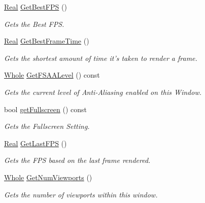 \begin{DoxyCompactItemize}
\hyperlink{namespaceMezzanine_a726731b1a7df72bf3583e4a97282c6f6}{Real} \hyperlink{classMezzanine_1_1GameWindow_a366478a0038149d243d0ef19eacea696}{GetBestFPS} ()
\begin{DoxyCompactList}\small\item\em Gets the Best FPS. \item\end{DoxyCompactList}\item 
\hyperlink{namespaceMezzanine_a726731b1a7df72bf3583e4a97282c6f6}{Real} \hyperlink{classMezzanine_1_1GameWindow_add46a3048c8eb963dae0758c47316bc4}{GetBestFrameTime} ()
\begin{DoxyCompactList}\small\item\em Gets the shortest amount of time it's taken to render a frame. \item\end{DoxyCompactList}\item 
\hyperlink{namespaceMezzanine_adcbb6ce6d1eb4379d109e51171e2e493}{Whole} \hyperlink{classMezzanine_1_1GameWindow_a221263d2fe846eeaefe18b6817642dd8}{GetFSAALevel} () const 
\begin{DoxyCompactList}\small\item\em Gets the current level of Anti-\/Aliasing enabled on this Window. \item\end{DoxyCompactList}\item 
bool \hyperlink{classMezzanine_1_1GameWindow_a44e2caa0a6300c5365deb287c79c0153}{getFullscreen} () const 
\begin{DoxyCompactList}\small\item\em Gets the Fullscreen Setting. \item\end{DoxyCompactList}\item 
\hyperlink{namespaceMezzanine_a726731b1a7df72bf3583e4a97282c6f6}{Real} \hyperlink{classMezzanine_1_1GameWindow_af298623981d66effc33760484c6b11d7}{GetLastFPS} ()
\begin{DoxyCompactList}\small\item\em Gets the FPS based on the last frame rendered. \item\end{DoxyCompactList}\item 
\hyperlink{namespaceMezzanine_adcbb6ce6d1eb4379d109e51171e2e493}{Whole} \hyperlink{classMezzanine_1_1GameWindow_a69e900fe0f1cb85cd1723991ebf808c5}{GetNumViewports} ()
\begin{DoxyCompactList}\small\item\em Gets the number of viewports within this window. \item\end{DoxyCompactList}\item 

\end{DoxyCompactItemize}
